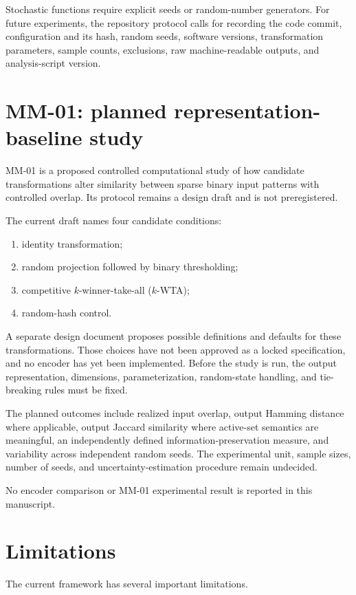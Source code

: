 \documentclass[11pt,a4paper]{article}
\begin{document}
Stochastic functions require explicit seeds or random-number generators. For future experiments, the repository protocol calls for recording the code commit, configuration and its hash, random seeds, software versions, transformation parameters, sample counts, exclusions, raw machine-readable outputs, and analysis-script version.

\section{MM-01: planned representation-baseline study}

MM-01 is a proposed controlled computational study of how candidate transformations alter similarity between sparse binary input patterns with controlled overlap. Its protocol remains a design draft and is not preregistered.

The current draft names four candidate conditions:
\begin{enumerate}
    \item identity transformation;
    \item random projection followed by binary thresholding;
    \item competitive $k$-winner-take-all ($k$-WTA);
    \item random-hash control.
\end{enumerate}

A separate design document proposes possible definitions and defaults for these transformations. Those choices have not been approved as a locked specification, and no encoder has yet been implemented. Before the study is run, the output representation, dimensions, parameterization, random-state handling, and tie-breaking rules must be fixed.

The planned outcomes include realized input overlap, output Hamming distance where applicable, output Jaccard similarity where active-set semantics are meaningful, an independently defined information-preservation measure, and variability across independent random seeds. The experimental unit, sample sizes, number of seeds, and uncertainty-estimation procedure remain undecided.

No encoder comparison or MM-01 experimental result is reported in this manuscript.

\section{Limitations}

The current framework has several important limitations.
\end{document}
